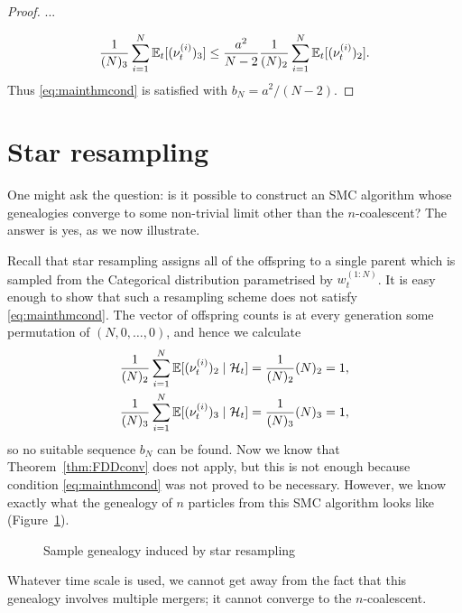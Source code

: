 \begin{proof}
...

\begin{equation*}
\frac{1}{(N)_3} \sum_{i=1}^N \mathbb{E}_t [ (\nu_t^{(i)})_3 ]
\leq \frac{a^2}{N-2} \frac{1}{(N)_2} \sum_{i=1}^N \mathbb{E}_t [ (\nu_t^{(i)})_2 ] .
\end{equation*}
Thus \eqref{eq:mainthmcond} is satisfied with $b_N = a^2/(N-2)$.

\end{proof}





\section{Star resampling \seb{$\checkmark$} }
One might ask the question: is it possible to construct an SMC algorithm whose genealogies converge to some non-trivial limit other than the $n$-coalescent?
The answer is yes, as we now illustrate.

Recall that star resampling assigns all of the offspring to a single parent which is sampled from the Categorical distribution parametrised by $w_t^{(1:N)}$.
It is easy enough to show that such a resampling scheme does not satisfy \eqref{eq:mainthmcond}.
The vector of offspring counts is at every generation some permutation of $(N,0,\dots,0)$, and hence we calculate
\begin{align*}
\frac{1}{(N)_2} \sum_{i=1}^N \mathbb{E}[ (\nu_t^{(i)})_2 \mid \mathcal{H}_t ]
&= \frac{1}{(N)_2} (N)_2 = 1 , \\
\frac{1}{(N)_3} \sum_{i=1}^N \mathbb{E}[ (\nu_t^{(i)})_3 \mid \mathcal{H}_t ]
&= \frac{1}{(N)_3} (N)_3 = 1 ,
\end{align*}
so no suitable sequence $b_N$ can be found.
Now we know that Theorem~\ref{thm:FDDconv} does not apply, but this is not enough because condition \eqref{eq:mainthmcond} was not proved to be necessary.
However, we know exactly what the genealogy of $n$ particles from this SMC algorithm looks like (Figure~\ref{fig:star_genealogy}).
\begin{figure}[ht]
\centering
{}
\caption{Sample genealogy induced by star resampling}
\label{fig:star_genealogy}
\end{figure}
Whatever time scale is used, we cannot get away from the fact that this genealogy involves multiple mergers; it cannot converge to the $n$-coalescent.

